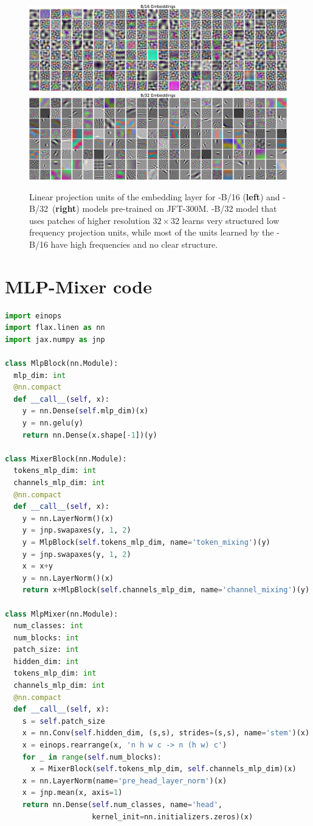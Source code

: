 \begin{figure}[t]
    \includegraphics[width=0.49\linewidth]{pics/embedding_visualization_b16_jft300m.pdf}\hfill
    \includegraphics[width=0.49\linewidth]{pics/embedding_visualization_b32_jft300m.pdf}
    \caption{Linear projection units of the embedding layer for \name{}-B/16 ({\bf left}) and \name{}-B/32~({\bf right}) models pre-trained on JFT-300M.
    \name{}-B/32 model that uses patches of higher resolution $32\times 32$ learns very structured low frequency projection units, while most of the units learned by the \name{}-B/16 have high frequencies and no clear structure.
    }
  \label{appendix:fig:embedding-plots}
\end{figure}

\FloatBarrier

\section{MLP-Mixer code}
\label{appendix:sec:code}

\begin{lstlisting}[language=Python, caption=MLP-Mixer code written in JAX/Flax.]
import einops
import flax.linen as nn
import jax.numpy as jnp

class MlpBlock(nn.Module):
  mlp_dim: int
  @nn.compact
  def __call__(self, x):
    y = nn.Dense(self.mlp_dim)(x)
    y = nn.gelu(y)
    return nn.Dense(x.shape[-1])(y)

class MixerBlock(nn.Module):
  tokens_mlp_dim: int
  channels_mlp_dim: int
  @nn.compact
  def __call__(self, x):
    y = nn.LayerNorm()(x)
    y = jnp.swapaxes(y, 1, 2)
    y = MlpBlock(self.tokens_mlp_dim, name='token_mixing')(y)
    y = jnp.swapaxes(y, 1, 2)
    x = x+y
    y = nn.LayerNorm()(x)
    return x+MlpBlock(self.channels_mlp_dim, name='channel_mixing')(y)

class MlpMixer(nn.Module):
  num_classes: int
  num_blocks: int
  patch_size: int
  hidden_dim: int
  tokens_mlp_dim: int
  channels_mlp_dim: int
  @nn.compact
  def __call__(self, x):
    s = self.patch_size
    x = nn.Conv(self.hidden_dim, (s,s), strides=(s,s), name='stem')(x)
    x = einops.rearrange(x, 'n h w c -> n (h w) c')
    for _ in range(self.num_blocks):
      x = MixerBlock(self.tokens_mlp_dim, self.channels_mlp_dim)(x)
    x = nn.LayerNorm(name='pre_head_layer_norm')(x)
    x = jnp.mean(x, axis=1)
    return nn.Dense(self.num_classes, name='head',
                    kernel_init=nn.initializers.zeros)(x)

\end{lstlisting}